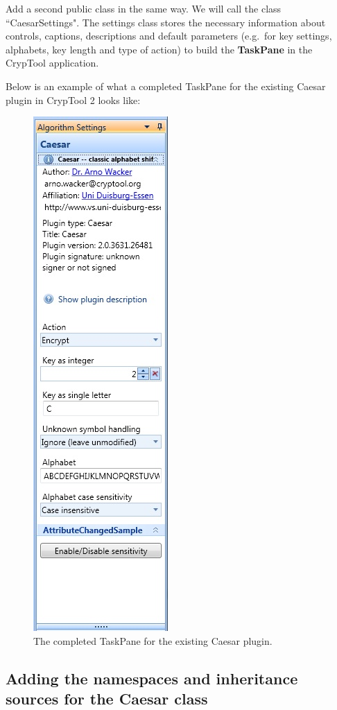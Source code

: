 Add a second public class in the same way. We will call the class ``CaesarSettings". The settings class stores the necessary information about controls, captions, descriptions and default parameters (e.g.\ for key settings, alphabets, key length and type of action) to build the \textbf{TaskPane} in the CrypTool application.
\clearpage

Below is an example of what a completed TaskPane for the existing Caesar plugin in CrypTool 2 looks like:

\begin{figure}[h!]
	\centering
		\includegraphics{figures/task_pane.jpg}
	\caption{The completed TaskPane for the existing Caesar plugin.}
	\label{fig:task_pane}
\end{figure}
\clearpage

\subsection{Adding the namespaces and inheritance sources for the Caesar class}
\label{sec:AddingTheNamespacesAndInheritanceSourcesForTheCaesarClass}

